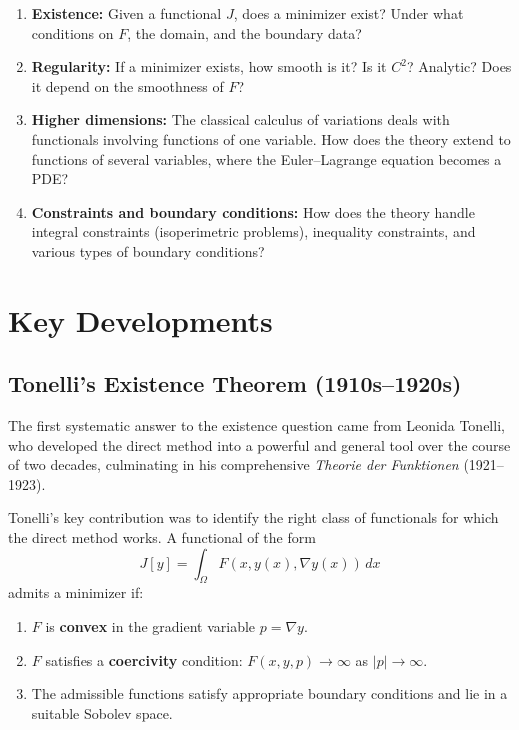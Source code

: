 \begin{enumerate}
    \item \textbf{Existence:} Given a functional $J$, does a minimizer exist? Under what conditions on $F$, the domain, and the boundary data?
    \item \textbf{Regularity:} If a minimizer exists, how smooth is it? Is it $C^2$? Analytic? Does it depend on the smoothness of $F$?
    \item \textbf{Higher dimensions:} The classical calculus of variations deals with functionals involving functions of one variable. How does the theory extend to functions of several variables, where the Euler--Lagrange equation becomes a PDE?
    \item \textbf{Constraints and boundary conditions:} How does the theory handle integral constraints (isoperimetric problems), inequality constraints, and various types of boundary conditions?
\end{enumerate}

\section{Key Developments}

\subsection{Tonelli's Existence Theorem (1910s--1920s)}

The first systematic answer to the existence question came from Leonida Tonelli, who developed the direct method into a powerful and general tool over the course of two decades, culminating in his comprehensive \emph{Theorie der Funktionen} (1921--1923).

Tonelli's key contribution was to identify the right class of functionals for which the direct method works. A functional of the form
\[
    J[y] = \int_\Omega F(x, y(x), \nabla y(x)) \, dx
\]
admits a minimizer if:
\begin{enumerate}
    \item $F$ is \textbf{convex} in the gradient variable $p = \nabla y$.
    \item $F$ satisfies a \textbf{coercivity} condition: $F(x, y, p) \to \infty$ as $|p| \to \infty$.
    \item The admissible functions satisfy appropriate boundary conditions and lie in a suitable Sobolev space.
\end{enumerate}

